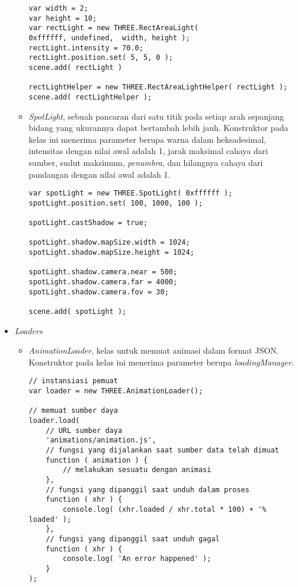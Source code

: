 \begin{itemize}
\begin{itemize}
\begin{lstlisting}[caption={Contoh penggunaan kelas {\it RectAreaLight}.},captionpos=b]
var width = 2;
var height = 10;
var rectLight = new THREE.RectAreaLight(
0xffffff, undefined,  width, height );
rectLight.intensity = 70.0;
rectLight.position.set( 5, 5, 0 );
scene.add( rectLight )

rectLightHelper = new THREE.RectAreaLightHelper( rectLight );
scene.add( rectLightHelper );
\end{lstlisting}

	\item {\it SpotLight}, sebuah pancaran dari satu titik pada setiap arah sepanjang bidang yang ukurannya dapat bertambah lebih jauh. Konstruktor pada kelas ini menerima parameter berupa warna dalam heksadesimal, intensitas dengan nilai awal adalah 1, jarak maksimal cahaya dari sumber, sudut maksimum, {\it penumbra}, dan hilangnya cahaya dari pandangan dengan nilai awal adalah 1.
	
\begin{lstlisting}[caption={Contoh penggunaan kelas {\it SpotLight}.},captionpos=b]
var spotLight = new THREE.SpotLight( 0xffffff );
spotLight.position.set( 100, 1000, 100 );

spotLight.castShadow = true;

spotLight.shadow.mapSize.width = 1024;
spotLight.shadow.mapSize.height = 1024;

spotLight.shadow.camera.near = 500;
spotLight.shadow.camera.far = 4000;
spotLight.shadow.camera.fov = 30;

scene.add( spotLight );
\end{lstlisting}

	\end{itemize}
	
\item \textit{Loaders}

	\begin{itemize}
	\item {\it AnimationLoader}, kelas untuk memuat animasi dalam format JSON. Konstruktor pada kelas ini menerima parameter berupa {\it loadingManager}.
	
\begin{lstlisting}[caption={Contoh penggunaan kelas {\it AnimationLoader}.},captionpos=b]
// instansiasi pemuat
var loader = new THREE.AnimationLoader();

// memuat sumber daya
loader.load(
	// URL sumber daya
	'animations/animation.js',
	// fungsi yang dijalankan saat sumber data telah dimuat
	function ( animation ) {
		// melakukan sesuatu dengan animasi
	},
	// fungsi yang dipanggil saat unduh dalam proses
	function ( xhr ) {
		console.log( (xhr.loaded / xhr.total * 100) + '% loaded' );
	},
	// fungsi yang dipanggil saat unduh gagal
	function ( xhr ) {
		console.log( 'An error happened' );
	}
);
\end{lstlisting}


\end{itemize}
\end{itemize}
